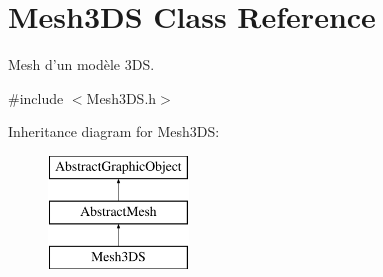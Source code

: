 \hypertarget{classMesh3DS}{\section{Mesh3\-D\-S Class Reference}
\label{classMesh3DS}
}


Mesh d'un modèle 3\-D\-S.  




{\ttfamily \#include $<$Mesh3\-D\-S.\-h$>$}

Inheritance diagram for Mesh3\-D\-S\-:\begin{figure}[H]
\begin{center}
\leavevmode
\includegraphics[height=3.000000cm]{classMesh3DS}
\end{center}
\end{figure}
